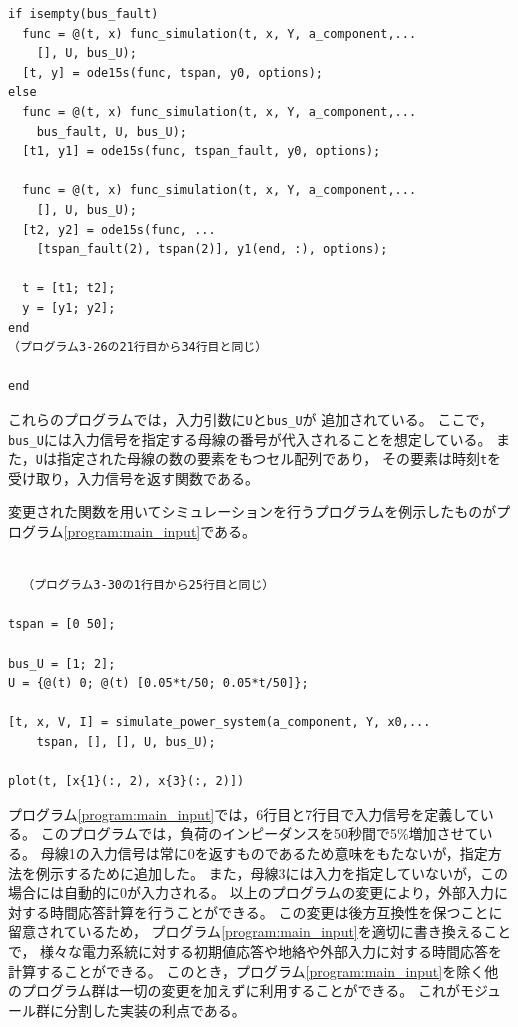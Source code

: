 \documentclass[tombow,dvipdfmx]{corona-a5-1.1}
\begin{document}
\begin{例}[入力信号に対する時間応答の数値計算]
\begin{PROGRAMA}[count,title={simulate\_power\_system.m}]
\begin{verbatim}
if isempty(bus_fault)
  func = @(t, x) func_simulation(t, x, Y, a_component,...
    [], U, bus_U);
  [t, y] = ode15s(func, tspan, y0, options);
else
  func = @(t, x) func_simulation(t, x, Y, a_component,...
    bus_fault, U, bus_U);
  [t1, y1] = ode15s(func, tspan_fault, y0, options);
  
  func = @(t, x) func_simulation(t, x, Y, a_component,...
    [], U, bus_U);
  [t2, y2] = ode15s(func, ...
    [tspan_fault(2), tspan(2)], y1(end, :), options);
  
  t = [t1; t2];
  y = [y1; y2];
end
（プログラム3-26の21行目から34行目と同じ）

end
\end{verbatim}
\end{PROGRAMA}

これらのプログラムでは，入力引数に\verb|U|と\verb|bus_U|が
追加されている。
ここで，\verb|bus_U|には入力信号を指定する母線の番号が代入されることを想定している。
また，\verb|U|は指定された母線の数の要素をもつセル配列であり，
その要素は時刻\verb|t|を受け取り，入力信号を返す関数である。

変更された関数を用いてシミュレーションを行うプログラムを例示したものがプログラム\nobreak\ref{program:main_input}である。

\smallskip
\begin{PROGRAMA}[count,title={main\_simulation\_3bus\_input.m}]\label{program:main_input}
\begin{verbatim}

  （プログラム3-30の1行目から25行目と同じ）

tspan = [0 50];

bus_U = [1; 2];
U = {@(t) 0; @(t) [0.05*t/50; 0.05*t/50]};

[t, x, V, I] = simulate_power_system(a_component, Y, x0,...
    tspan, [], [], U, bus_U);

plot(t, [x{1}(:, 2), x{3}(:, 2)])
  \end{verbatim}
\end{PROGRAMA}

プログラム\nobreak\ref{program:main_input}では，6行目と7行目で入力信号を定義している。
このプログラムでは，負荷のインピーダンスを50秒間で5\%増加させている。
母線1の入力信号は常に0を返すものであるため意味をもたないが，指定方法を例示するために追加した。
また，母線3には入力を指定していないが，この場合には自動的に0が入力される。
以上のプログラムの変更により，外部入力に対する時間応答計算を行うことができる。
この変更は後方互換性を保つことに留意されているため，
プログラム\nobreak\ref{program:main_input}を適切に書き換えることで，
様々な電力系統に対する初期値応答や地絡や外部入力に対する時間応答を計算することができる。
このとき，プログラム\nobreak\ref{program:main_input}を除く他のプログラム群は一切の変更を加えずに利用することができる。
これがモジュール群に分割した実装の利点である。
\end{例}
\end{document}
